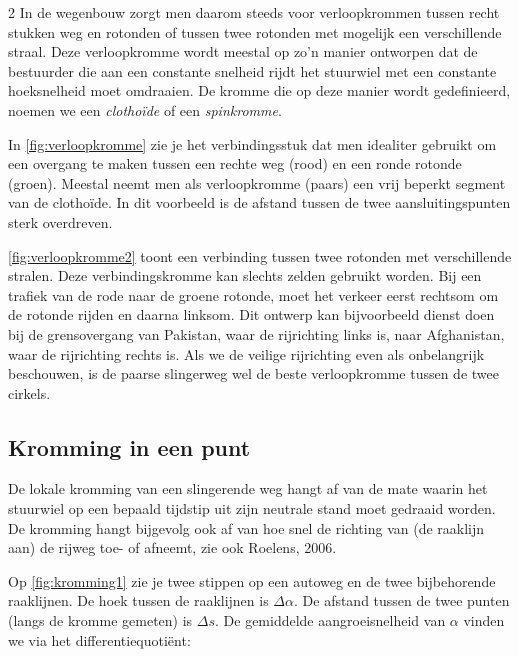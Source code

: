 \begin{multicols}{2}
In de wegenbouw zorgt men daarom steeds voor verloopkrommen tussen recht stukken weg en rotonden of tussen twee rotonden met mogelijk een verschillende straal. Deze verloopkromme wordt meestal op zo'n manier ontworpen dat de bestuurder die aan een constante snelheid rijdt het stuurwiel met een constante hoeksnelheid moet omdraaien. De kromme die op deze manier wordt gedefinieerd, noemen we een \emph{clothoïde} of een \emph{spinkromme}.

In \autoref{fig:verloopkromme} zie je het verbindingsstuk dat men idealiter gebruikt om een overgang te maken tussen een rechte weg (rood) en een ronde rotonde (groen). Meestal neemt men als verloopkromme (paars) een vrij beperkt segment van de clothoïde. In dit voorbeeld is de afstand tussen de twee aansluitingspunten sterk overdreven.



\autoref{fig:verloopkromme2} toont een verbinding tussen twee rotonden met verschillende stralen. Deze verbindingskromme kan slechts zelden gebruikt worden. Bij een trafiek van de rode naar de groene rotonde, moet het verkeer eerst rechtsom om de rotonde rijden en daarna linksom. Dit ontwerp kan bijvoorbeeld dienst doen bij de grensovergang van Pakistan, waar de rijrichting links is, naar Afghanistan, waar de rijrichting rechts is. Als we de veilige rijrichting even als onbelangrijk beschouwen, is de paarse slingerweg wel de beste verloopkromme tussen de twee cirkels. 

\subsection{Kromming in een punt}

De lokale kromming van een slingerende weg hangt af van de mate waarin het stuurwiel op een bepaald tijdstip uit zijn neutrale stand moet gedraaid worden. De kromming hangt bijgevolg ook af van hoe snel de richting van (de raaklijn aan) de rijweg toe- of afneemt, zie ook Roelens, 2006. 

Op \autoref{fig:kromming1} zie je twee stippen op een autoweg en de twee bijbehorende raaklijnen. De hoek tussen de raaklijnen is $\Delta \alpha$. De afstand tussen de twee punten (langs de kromme gemeten) is $\Delta s$. De gemiddelde aangroeisnelheid van $\alpha$ vinden we via het differentiequotiënt:


\end{multicols}
